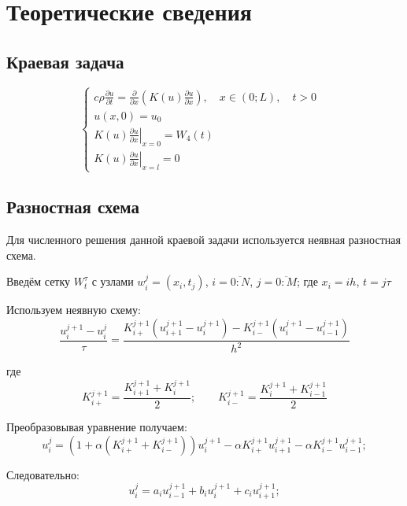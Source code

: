 \documentclass[titlepage,12pt]{article}
\begin{document}
\setcounter{page}{2}
\newpage
\section{Теоретические сведения}
\subsection{Краевая задача}

\begin{displaymath}
\left \{ 
\begin{array}{ll}
c\rho \frac{\partial u}{\partial t} = \frac{\partial }{\partial x}\left(K(u)\frac{\partial u}{\partial x}\right),\quad x \in (0;L), \quad t > 0
 & \\
u(x,0) = u_0 & \\
\left.K(u)\frac{\partial u}{\partial x}\right |_{x=0} = W_4(t) \\
\left.K(u)\frac{\partial u}{\partial x}\right |_{x=l} = 0
\end{array} 
\right.
\end{displaymath}

\subsection{Разностная схема}
Для численного решения данной краевой задачи используется неявная разностная схема.
 
Введём сетку $W_t^\tau$ с узлами \(w_i^j = (x_i, t_j)\), \(i = \overline{0:N}\), \(j = \overline{0:M}\); где \(x_i = ih\), \(t = j\tau\) 

Используем неявную схему:
\begin{equation}
\frac{u_i^{j+1} - u_i^j}{\tau} = \frac{K_{i+}^{j+1}(u_{i+1}^{j+1} - u_i^{j+1}) - K_{i-}^{j+1}(u_i^{j+1} - u_{i-1}^{j+1})}{h^2}
\end{equation}

где
\begin{equation}
K_{i+}^{j+1} = \frac{K_{i+1}^{j+1} + K_i^{j+1}}{2};   \qquad
K_{i-}^{j+1} = \frac{K_i^{j+1} + K_{i-1}^{j+1}}{2} 
\end{equation}

Преобразовывая уравнение получаем:
\begin{equation}
u_i^j = (1 + \alpha(K_{i+}^{j+1} + K_{i-}^{j+1}))u_i^{j+1} - \alpha{K_{i+}^{j+1}u_{i+1}^{j+1}} - \alpha{K_{i-}^{j+1}u_{i-1}^{j+1}}; 
\end{equation}

Следовательно:
\begin{equation}
u_i^j = a_iu_{i-1}^{j+1} + b_iu_i^{j+1} +c_iu_{i+1}^{j+1}; 
\end{equation}
\end{document}
